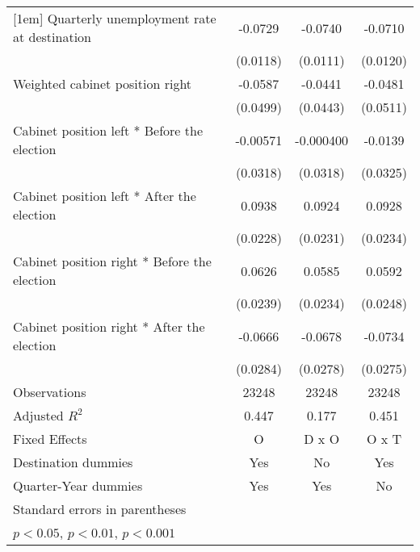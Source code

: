 \begin{table}[htbp]
\begin{tabular}{l*{3}{c}}
[1em]
Quarterly unemployment rate at destination&     -0.0729\sym{***}&     -0.0740\sym{***}&     -0.0710\sym{***}\\
                    &    (0.0118)         &    (0.0111)         &    (0.0120)         \\
[1em]
Weighted cabinet position right&     -0.0587         &     -0.0441         &     -0.0481         \\
                    &    (0.0499)         &    (0.0443)         &    (0.0511)         \\
[1em]
Cabinet position left * Before the election&    -0.00571         &   -0.000400         &     -0.0139         \\
                    &    (0.0318)         &    (0.0318)         &    (0.0325)         \\
[1em]
Cabinet position left * After the election&      0.0938\sym{***}&      0.0924\sym{***}&      0.0928\sym{***}\\
                    &    (0.0228)         &    (0.0231)         &    (0.0234)         \\
[1em]
Cabinet position right * Before the election&      0.0626\sym{*}  &      0.0585\sym{*}  &      0.0592\sym{*}  \\
                    &    (0.0239)         &    (0.0234)         &    (0.0248)         \\
[1em]
Cabinet position right * After the election&     -0.0666\sym{*}  &     -0.0678\sym{*}  &     -0.0734\sym{*}  \\
                    &    (0.0284)         &    (0.0278)         &    (0.0275)         \\
\hline
Observations        &       23248         &       23248         &       23248         \\
Adjusted \(R^{2}\)  &       0.447         &       0.177         &       0.451         \\
Fixed Effects       &           O         &       D x O         &       O x T         \\
Destination dummies &         Yes         &          No         &         Yes         \\
Quarter-Year dummies&         Yes         &         Yes         &          No         \\
\hline\hline
\multicolumn{4}{l}{\footnotesize Standard errors in parentheses}\\
\multicolumn{4}{l}{\footnotesize \sym{*} \(p<0.05\), \sym{**} \(p<0.01\), \sym{***} \(p<0.001\)}\\
\end{tabular}
\end{table}
